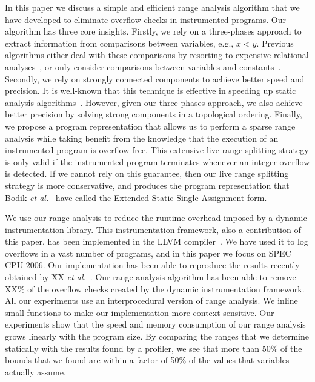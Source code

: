 \documentclass[preprint]{sigplanconf}[10pt]
\begin{document}
In this paper we discuss a simple and efficient range analysis algorithm that
we have developed to eliminate overflow checks in instrumented programs.
Our algorithm has three core insights.
Firstly, we rely on a three-phases approach to extract information from
comparisons between variables, e.g., $x < y$.
Previous algorithms either deal with these comparisons by resorting to
expensive relational analyses~\cite{Cousot78,Lakhdar11,Mine06}, or only
consider comparisons between variables and
constants~\cite{Mahlke01,Patterson95,Stephenson00}.
Secondly, we rely on strongly connected components to achieve better speed and
precision.
It is well-known that this technique is effective in speeding up static analysis
algorithms~\cite[Sec 6.3]{Nielson99}.
However, given our three-phases approach, we also achieve better precision
by solving strong components in a topological ordering.
Finally, we propose a program representation that allows us to perform a sparse
range analysis while taking benefit from the knowledge that the execution of
an instrumented program is overflow-free.
This extensive live range splitting strategy is only valid if the instrumented
program terminates whenever an integer overflow is detected.
If we cannot rely on this guarantee, then our live range splitting strategy
is more conservative, and produces the program representation that Bodik
{\em et al.}~\cite{Bodik00} have called the Extended Static Single Assignment
form.

We use our range analysis to reduce the runtime overhead imposed by a dynamic
instrumentation library.
This instrumentation framework, also a contribution of this paper, has been
implemented in the LLVM compiler~\cite{Lattner04}.
We have used it to log overflows in a vast number of programs, and in this
paper we focus on SPEC CPU 2006.
Our implementation has been able to reproduce the results recently obtained by XX
{\em et al.}~\cite{TODO}.
Our range analysis algorithm has been able to remove XX\% of the overflow
checks created by the dynamic instrumentation framework.
All our experiments use an interprocedural version of range analysis.
We inline small functions to make our implementation more context sensitive.
Our experiments show that the speed and memory consumption of our range analysis
grows linearly with the program size.
By comparing the ranges that we determine statically with the results found by
a profiler, we see that more than 50\% of the bounds that we found are within a
factor of 50\% of the values that variables actually assume.
\end{document}
